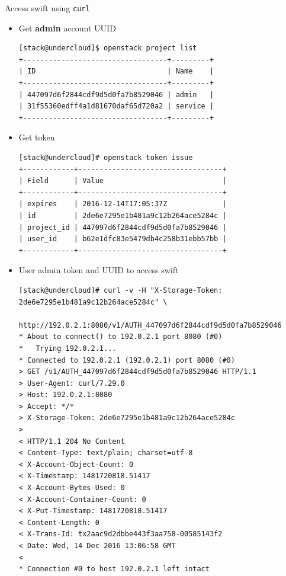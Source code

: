 \documentclass{article}
\begin{document}
\begin{itemize}
Access swift using \texttt{curl}

\begin{itemize}
\item Get \textbf{admin} account UUID

\begin{verbatim}
[stack@undercloud]$ openstack project list
+----------------------------------+---------+
| ID                               | Name    |
+----------------------------------+---------+
| 447097d6f2844cdf9d5d0fa7b8529046 | admin   |
| 31f55360edff4a1d81670daf65d720a2 | service |
+----------------------------------+---------+
\end{verbatim}

\item Get token

\begin{verbatim}
[stack@undercloud]# openstack token issue
+------------+----------------------------------+
| Field      | Value                            |
+------------+----------------------------------+
| expires    | 2016-12-14T17:05:37Z             |
| id         | 2de6e7295e1b481a9c12b264ace5284c |
| project_id | 447097d6f2844cdf9d5d0fa7b8529046 |
| user_id    | b62e1dfc83e5479db4c258b31ebb57bb |
+------------+----------------------------------+
\end{verbatim}

\item User admin token and UUID to access swift

\begin{verbatim}
[stack@undercloud]# curl -v -H "X-Storage-Token: 2de6e7295e1b481a9c12b264ace5284c" \
			       http://192.0.2.1:8080/v1/AUTH_447097d6f2844cdf9d5d0fa7b8529046
* About to connect() to 192.0.2.1 port 8080 (#0)
*   Trying 192.0.2.1...
* Connected to 192.0.2.1 (192.0.2.1) port 8080 (#0)
> GET /v1/AUTH_447097d6f2844cdf9d5d0fa7b8529046 HTTP/1.1
> User-Agent: curl/7.29.0
> Host: 192.0.2.1:8080
> Accept: */*
> X-Storage-Token: 2de6e7295e1b481a9c12b264ace5284c
>
< HTTP/1.1 204 No Content
< Content-Type: text/plain; charset=utf-8
< X-Account-Object-Count: 0
< X-Timestamp: 1481720818.51417
< X-Account-Bytes-Used: 0
< X-Account-Container-Count: 0
< X-Put-Timestamp: 1481720818.51417
< Content-Length: 0
< X-Trans-Id: tx2aac9d2dbbe443f3aa758-00585143f2
< Date: Wed, 14 Dec 2016 13:06:58 GMT
<
* Connection #0 to host 192.0.2.1 left intact
\end{verbatim}
\end{itemize}
\end{itemize}
\end{document}
